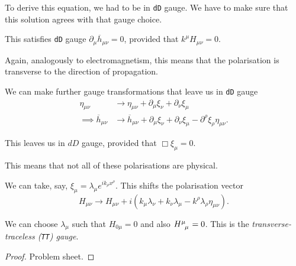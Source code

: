 To derive this equation, we had to be in \texttt{dD} gauge. We have to make sure that this solution agrees with that gauge choice.
\begin{claim}
  This satisfies \texttt{dD} gauge $\partial_{\mu} \overline{h}_{\mu\nu} = 0$, provided that $k^{\mu} H_{\mu\nu} = 0$.
\end{claim}

\begin{remark}
  Again, analogously to electromagnetism, this means that the polarisation is transverse to the direction of propagation.
\end{remark}

We can make further gauge transformations that leave us in \texttt{dD} gauge
\begin{align}
  \eta_{\mu\nu} &\to \eta_{\mu\nu} + \partial_{\mu} \xi_{\nu} + \partial_{\nu} \xi_{\mu} \\
  \implies \overline{h}_{\mu\nu} &\to \overline{h}_{\mu\nu} + \partial_{\mu} \xi_{\nu} +  \partial_{\nu} \xi_{\mu} - \partial^{\rho} \xi_{\rho} \eta_{\mu\nu}.
\end{align}

This leaves us in $dD$ gauge, provided that $\Box \xi_{\mu} = 0$.

\begin{remark}
  This means that not all of these polarisations are physical.
\end{remark}

We can take, say, $\xi_{\mu} = \lambda_{\mu} e^{i k_{\rho} x^{\rho}}$. This shifts the polarisation vector
\begin{equation}
  H_{\mu\nu} \to H_{\mu\nu} + i (k_{\mu} \lambda_{\nu} + k_{\nu} \lambda_{\mu} - k^{\rho} \lambda_{\rho} \eta_{\mu\nu}).
\end{equation}

\begin{claim}
  We can choose $\lambda_{\mu}$ such that $H_{0\mu} = 0$ and also $H\indices{^{\mu}_{\mu}} = 0$.
  This is the \emph{transverse-traceless (\texttt{TT}) gauge}.
\end{claim}
\begin{proof}
  Problem sheet.
\end{proof}
